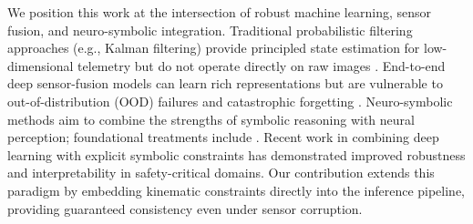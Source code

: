 We position this work at the intersection of robust machine learning, sensor fusion, and neuro-symbolic integration. Traditional probabilistic filtering approaches (e.g., Kalman filtering) provide principled state estimation for low-dimensional telemetry but do not operate directly on raw images \cite{kalman1960new,thrun2005probabilistic}. End-to-end deep sensor-fusion models can learn rich representations but are vulnerable to out-of-distribution (OOD) failures and catastrophic forgetting \cite{goodfellow2016deep}. Neuro-symbolic methods aim to combine the strengths of symbolic reasoning with neural perception; foundational treatments include \cite{garcez2009neural}. Recent work in combining deep learning with explicit symbolic constraints has demonstrated improved robustness and interpretability in safety-critical domains. Our contribution extends this paradigm by embedding kinematic constraints directly into the inference pipeline, providing guaranteed consistency even under sensor corruption.
